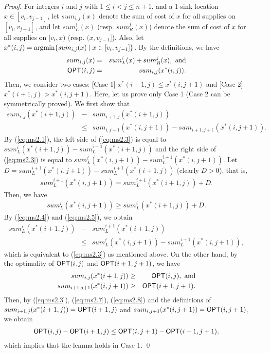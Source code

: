 \documentclass[a4paper]{llncs}
\newcommand{\argmin}{\operatornamewithlimits{argmin}}
\begin{document}
\begin{proof}
For integers $i$ and $j$ with $1 \le i < j \le n+1$, and a 1-sink location $x \in [v_i, v_{j-1}]$,
let $sum_{i, j}(x)$ denote the sum of cost of $x$ for all supplies on $[v_i, v_{j-1}]$,
and let $sum_L^i(x)$ (resp. $sum_R^j(x)$) denote the sum of cost of $x$ for all supplies on $[v_i, x)$ (resp. $(x, v_{j-1}]$).
Also, let $x^*(i, j) = \argmin \{ sum_{i, j}(x) \mid x \in [v_i, v_{j-1}] \}$.
By the definitions, we have
\begin{eqnarray}
sum_{i, j}(x) 	&=&	 sum_L^i(x) + sum_R^j(x), \ \mbox{and} \label{eq:ms2.1} \\
{\sf OPT}(i, j) 	&=&	 sum_{i, j}(x^*(i, j)). \label{eq:ms2.2}
\end{eqnarray}
Then, we consider two cases: [Case 1] $x^*(i+1, j) \le x^*(i, j+1)$ and [Case 2] $x^*(i+1, j) > x^*(i, j+1)$.
Here, let us prove only Case 1 (Case 2 can be symmetrically proved).
We first show that 
\begin{eqnarray}
sum_{i, j}(x^*(i+1, j)) &-&sum_{i+1, j}(x^*(i+1, j)) \nonumber \\
&\le& sum_{i, j+1}(x^*(i, j+1)) - sum_{i+1, j+1}(x^*(i, j+1)).
\label{eq:ms2.3}
\end{eqnarray}
By (\ref{eq:ms2.1}), the left side of (\ref{eq:ms2.3}) is equal to $sum_L^i(x^*(i+1, j)) - sum_L^{i+1}(x^*(i+1, j))$ and the right side of (\ref{eq:ms2.3}) is equal to $sum_L^i(x^*(i, j+1)) - sum_L^{i+1}(x^*(i, j+1))$.
Let $D = sum_L^{i+1}(x^*(i, j+1)) - sum_L^{i+1}(x^*(i+1, j))$ (clearly $D > 0$), that is,
\begin{eqnarray}
sum_L^{i+1}(x^*(i, j+1)) = sum_L^{i+1}(x^*(i+1, j)) + D.
\label{eq:ms2.4}
\end{eqnarray}
Then, we have 
\begin{eqnarray}
sum_L^i(x^*(i, j+1)) \ge sum_L^i(x^*(i+1, j)) + D.
\label{eq:ms2.5}
\end{eqnarray}
By (\ref{eq:ms2.4}) and (\ref{eq:ms2.5}), we obtain
\begin{eqnarray}
sum_L^i(x^*(i+1, j)) &-& sum_L^{i+1}(x^*(i+1, j)) \nonumber \\
&\le& sum_L^i(x^*(i, j+1)) - sum_L^{i+1}(x^*(i, j+1)),
\label{eq:ms2.6}
\end{eqnarray}
which is equivalent to (\ref{eq:ms2.3}) as mentioned above.
On the other hand, by the optimality of ${\sf OPT}(i, j)$ and ${\sf OPT}(i+1, j+1)$, we have
\begin{eqnarray}
sum_{i, j}(x^*(i+1, j)) 		&\ge& {\sf OPT}(i, j), \ \mbox{and} \label{eq:ms2.7} \\
sum_{i+1, j+1}(x^*(i, j+1))	&\ge& {\sf OPT}(i+1, j+1). \label{eq:ms2.8}
\end{eqnarray}
Then, by (\ref{eq:ms2.3}), (\ref{eq:ms2.7}), (\ref{eq:ms2.8}) and the definitions of $sum_{i+1, j}(x^*(i+1, j)) = {\sf OPT}(i+1, j)$ and $sum_{i, j+1}(x^*(i, j+1)) = {\sf OPT}(i, j+1)$, we obtain
\begin{eqnarray}
{\sf OPT}(i, j) - {\sf OPT}(i+1, j) \le {\sf OPT}(i, j+1) - {\sf OPT}(i+1, j+1),
\end{eqnarray}
which implies that the lemma holds in Case 1.
\qed
\end{proof}
\end{document}
